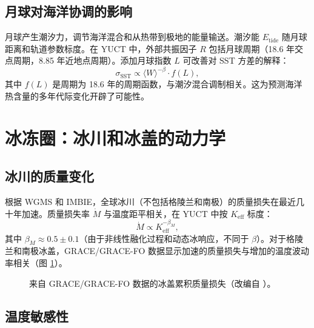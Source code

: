 \documentclass[12pt,a4paper]{article}
\newcommand{\Keff}{K_{\mathrm{eff}}}
\newcommand{\be}{\beta}
\begin{document}
	\subsection{月球对海洋协调的影响}
	
	月球产生潮汐力，调节海洋混合和从热带到极地的能量输送。潮汐能 \(E_{\text{tide}}\) 随月球距离和轨道参数标度。在 YUCT 中，外部共振因子 \(R\) 包括月球周期（18.6 年交点周期，8.85 年近地点周期）。添加月球指数 \(L\) 可改善对 SST 方差的解释：
	\[
	\sigma_{\text{SST}} \propto \langle W \rangle^{-\be} \cdot f(L),
	\]
	其中 \(f(L)\) 是周期为 18.6 年的周期函数，与潮汐混合调制相关。这为预测海洋热含量的多年代际变化开辟了可能性。
	
	\section{冰冻圈：冰川和冰盖的动力学}
	
	\subsection{冰川的质量变化}
	
	根据 WGMS 和 IMBIE，全球冰川（不包括格陵兰和南极）的质量损失在最近几十年加速。质量损失率 \(\dot{M}\) 与温度距平相关，在 YUCT 中按 \(\Keff\) 标度：
	\[
	\dot{M} \propto \Keff^{-\beta_M},
	\]
	其中 \(\beta_M \approx 0.5 \pm 0.1\)（由于非线性融化过程和动态冰响应，不同于 \(\be\)）。对于格陵兰和南极冰盖，GRACE/GRACE-FO 数据显示加速的质量损失与增加的温度波动率相关（图 \ref{fig:grace}）。
	
	\begin{figure}[htbp]
		\centering
		\caption{来自 GRACE/GRACE-FO 数据的冰盖累积质量损失（改编自 \cite{IMBIE}）。}
		\label{fig:grace}
	\end{figure}
	
	\subsection{温度敏感性}
	
\end{document}
